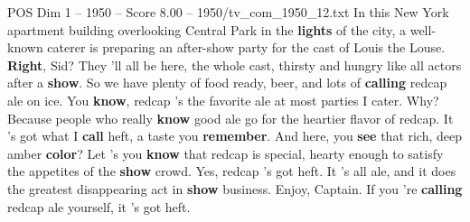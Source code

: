 \begin{textsample}{POS Dim 1 – 1950 – Score 8.00 – 1950/tv\_com\_1950\_12.txt}  \label{ex:f1_pos_018}
In this New York apartment building overlooking Central Park in the \textbf{lights} of the city, a well-known caterer is preparing an after-show party for the cast of Louis the Louse. \textbf{Right}, Sid?
They 'll all be here, the whole cast, thirsty and hungry like all actors after a \textbf{show}.
So we have plenty of food ready, beer, and lots of \textbf{calling} redcap ale on ice.
You \textbf{know}, redcap 's the favorite ale at most parties I cater.
Why?
Because people who really \textbf{know} good ale go for the heartier flavor of redcap.
It 's got what I \textbf{call} heft, a taste you \textbf{remember}.
And here, you \textbf{see} that rich, deep amber \textbf{color}?
Let 's you \textbf{know} that redcap is special, hearty enough to satisfy the appetites of the \textbf{show} crowd.
Yes, redcap 's got heft.
It 's all ale, and it does the greatest disappearing act in \textbf{show} business.
Enjoy, Captain.
If you 're \textbf{calling} redcap ale yourself, it 's got heft.

\end{textsample}

